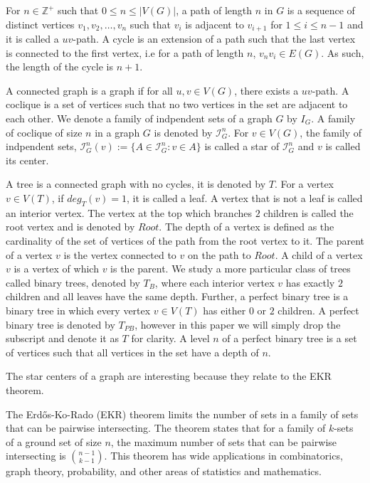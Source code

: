 \documentclass{amsart}
\theoremstyle{definition}
\begin{document}
For $n \in \mathbb{Z^+}$ such that  $0 \leq n \leq |V(G)|$, a path of length $n$ in $G$ is a sequence of distinct vertices $v_1, v_2, \ldots, v_n$ such that $v_i$ is adjacent to $v_{i+1}$ for $1 \leq i \leq n-1$ and it is called a $uv$-path. A cycle is an extension of a path such that the last vertex is connected to the first vertex, i.e for a path of length $n$, $v_nv_i \in E(G)$. As such, the length of the cycle is $n + 1$.

A connected graph is a graph if for all $u,v \in V(G)$, there exists a $uv$-path. A coclique is a set of vertices such that no two vertices in the set are adjacent to each other. We denote a family of indpendent sets of a graph $G$ by $I_G$. A family of coclique of size $n$ in a graph $G$ is denoted by $\mathcal{I}^n_G$. For $v \in V(G)$, the family of indpendent sets, $\mathcal{I}^n_G(v) := \{A \in \mathcal{I}^n_G : v \in A\}$ is called a star of $\mathcal{I}^n_G$ and $v$ is called its center.

A tree is a connected graph with no cycles, it is denoted by $T$. For a vertex $v \in V(T)$, if $deg_T(v) = 1$, it is called a leaf. A vertex that is not a leaf is called an interior vertex. The vertex at the top which branches $2$ children is called the root vertex and is denoted by $Root$. The depth of a vertex is defined as the cardinality of the set of vertices of the path from the root vertex to it. The parent of a vertex $v$ is the vertex connected to $v$ on the path to $Root$. A child of a vertex $v$ is a vertex of which $v$ is the parent. We study a more particular class of trees called binary trees, denoted by $T_B$, where each interior vertex $v$ has exactly $2$ children and all leaves have the same depth. Further, a perfect binary tree is a binary tree in which every vertex $v \in V(T)$ has either $0$ or $2$ children. A perfect binary tree is denoted by $T_{PB}$, however in this paper we will simply drop the subscript and denote it as $T$ for clarity. A level $n$ of a perfect binary tree is a set of vertices such that all vertices in the set have a depth of $n$.

The star centers of a graph are interesting because they relate to the EKR theorem. 


The Erd\H{o}s-Ko-Rado (EKR) theorem limits the number of sets in a family of sets that can be pairwise intersecting. The theorem states that for a family of $k$-sets of a ground set of size $n$, the maximum number of sets that can be pairwise intersecting is $\binom{n-1}{k-1}$. This theorem has wide applications in combinatorics, graph theory, probability, and other areas of statistics and mathematics.
\end{document}
